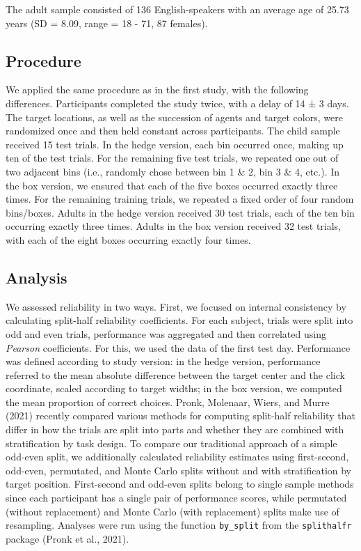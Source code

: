 \documentclass[
  man,floatsintext]{apa6}
\begin{document}
The adult sample consisted of 136 English-speakers with an average age of 25.73 years (SD = 8.09, range = 18 - 71, 87 females).

\hypertarget{procedure-1}{%
\subsection{Procedure}\label{procedure-1}}

We applied the same procedure as in the first study, with the following differences.
Participants completed the study twice, with a delay of 14 ± 3 days.
The target locations, as well as the succession of agents and target colors, were randomized once and then held constant across participants.
The child sample received 15 test trials.
In the hedge version, each bin occurred once, making up ten of the test trials.
For the remaining five test trials, we repeated one out of two adjacent bins (i.e., randomly chose between bin 1 \& 2, bin 3 \& 4, etc.).
In the box version, we ensured that each of the five boxes occurred exactly three times.
For the remaining training trials, we repeated a fixed order of four random bins/boxes.
Adults in the hedge version received 30 test trials, each of the ten bin occurring exactly three times.
Adults in the box version received 32 test trials, with each of the eight boxes occurring exactly four times.

\hypertarget{analysis-1}{%
\subsection{Analysis}\label{analysis-1}}

We assessed reliability in two ways.
First, we focused on internal consistency by calculating split-half reliability coefficients.
For each subject, trials were split into odd and even trials, performance was aggregated and then correlated using \emph{Pearson} coefficients.
For this, we used the data of the first test day.
Performance was defined according to study version: in the hedge version, performance referred to the mean absolute difference between the target center and the click coordinate, scaled according to target widths; in the box version, we computed the mean proportion of correct choices.
Pronk, Molenaar, Wiers, and Murre (2021) recently compared various methods for computing split-half reliability that differ in how the trials are split into parts and whether they are combined with stratification by task design.
To compare our traditional approach of a simple odd-even split, we additionally calculated reliability estimates using first-second, odd-even, permutated, and Monte Carlo splits without and with stratification by target position.
First-second and odd-even splits belong to single sample methods since each participant has a single pair of performance scores, while permutated (without replacement) and Monte Carlo (with replacement) splits make use of resampling.
Analyses were run using the function \texttt{by\_split} from the \texttt{splithalfr} package (Pronk et al., 2021).
\end{document}
